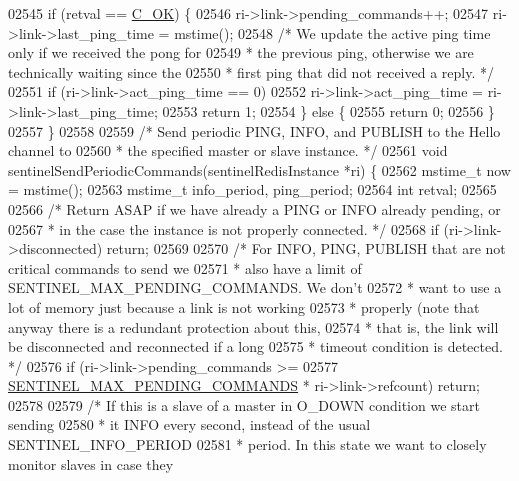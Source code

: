 \begin{DoxyCode}
{{{{{{{{{{{{{{{{{{{{{{{{{{{{{{{{{{{{{{{{{{{{{{{{{{{{{{{{{02545     \textcolor{keywordflow}{if} (retval == \hyperlink{server_8h_a303769ef1065076e68731584e758d3e1}{C\_OK}) \{
02546         ri->link->pending\_commands++;
02547         ri->link->last\_ping\_time = mstime();
02548         \textcolor{comment}{/* We update the active ping time only if we received the pong for}
02549 \textcolor{comment}{         * the previous ping, otherwise we are technically waiting since the}
02550 \textcolor{comment}{         * first ping that did not received a reply. */}
02551         \textcolor{keywordflow}{if} (ri->link->act\_ping\_time == 0)
02552             ri->link->act\_ping\_time = ri->link->last\_ping\_time;
02553         \textcolor{keywordflow}{return} 1;
02554     \} \textcolor{keywordflow}{else} \{
02555         \textcolor{keywordflow}{return} 0;
02556     \}
02557 \}
02558 
02559 \textcolor{comment}{/* Send periodic PING, INFO, and PUBLISH to the Hello channel to}
02560 \textcolor{comment}{ * the specified master or slave instance. */}
02561 \textcolor{keywordtype}{void} sentinelSendPeriodicCommands(sentinelRedisInstance *ri) \{
02562     mstime\_t now = mstime();
02563     mstime\_t info\_period, ping\_period;
02564     \textcolor{keywordtype}{int} retval;
02565 
02566     \textcolor{comment}{/* Return ASAP if we have already a PING or INFO already pending, or}
02567 \textcolor{comment}{     * in the case the instance is not properly connected. */}
02568     \textcolor{keywordflow}{if} (ri->link->disconnected) \textcolor{keywordflow}{return};
02569 
02570     \textcolor{comment}{/* For INFO, PING, PUBLISH that are not critical commands to send we}
02571 \textcolor{comment}{     * also have a limit of SENTINEL\_MAX\_PENDING\_COMMANDS. We don't}
02572 \textcolor{comment}{     * want to use a lot of memory just because a link is not working}
02573 \textcolor{comment}{     * properly (note that anyway there is a redundant protection about this,}
02574 \textcolor{comment}{     * that is, the link will be disconnected and reconnected if a long}
02575 \textcolor{comment}{     * timeout condition is detected. */}
02576     \textcolor{keywordflow}{if} (ri->link->pending\_commands >=
02577         \hyperlink{sentinel_8c_a5555400e8b8c3a25d6a2ccc6db1cd411}{SENTINEL\_MAX\_PENDING\_COMMANDS} * ri->link->refcount) \textcolor{keywordflow}{return};
02578 
02579     \textcolor{comment}{/* If this is a slave of a master in O\_DOWN condition we start sending}
02580 \textcolor{comment}{     * it INFO every second, instead of the usual SENTINEL\_INFO\_PERIOD}
02581 \textcolor{comment}{     * period. In this state we want to closely monitor slaves in case they}
}}}}}}}}}}}}}}}}}}}}}}}}}}}}}}}}}}}}}}}}}}}}}}}}}}}}}}}}}
\end{DoxyCode}
